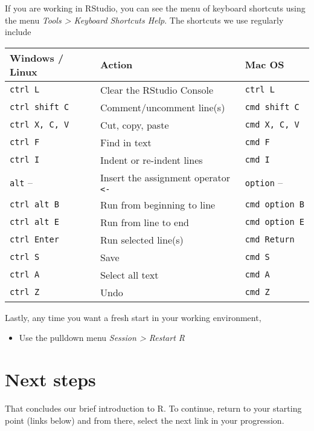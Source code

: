 \documentclass[
]{book}
\providecommand{\tightlist}{%
  \setlength{\itemsep}{0pt}\setlength{\parskip}{0pt}}
\begin{document}
If you are working in RStudio, you can see the menu of keyboard
shortcuts using the menu \emph{Tools \textgreater{} Keyboard Shortcuts Help}. The
shortcuts we use regularly include

\begin{longtable}[]{@{}lll@{}}
\toprule
Windows / Linux & Action & Mac OS \\
\midrule
\endhead
\texttt{ctrl\ L} & Clear the RStudio Console & \texttt{ctrl\ L} \\
\texttt{ctrl\ shift\ C} & Comment/uncomment line(s) & \texttt{cmd\ shift\ C} \\
\texttt{ctrl\ X,\ C,\ V} & Cut, copy, paste & \texttt{cmd\ X,\ C,\ V} \\
\texttt{ctrl\ F} & Find in text & \texttt{cmd\ F} \\
\texttt{ctrl\ I} & Indent or re-indent lines & \texttt{cmd\ I} \\
\texttt{alt} -- & Insert the assignment operator \texttt{\textless{}-} & \texttt{option} -- \\
\texttt{ctrl\ alt\ B} & Run from beginning to line & \texttt{cmd\ option\ B} \\
\texttt{ctrl\ alt\ E} & Run from line to end & \texttt{cmd\ option\ E} \\
\texttt{ctrl\ Enter} & Run selected line(s) & \texttt{cmd\ Return} \\
\texttt{ctrl\ S} & Save & \texttt{cmd\ S} \\
\texttt{ctrl\ A} & Select all text & \texttt{cmd\ A} \\
\texttt{ctrl\ Z} & Undo & \texttt{cmd\ Z} \\
\bottomrule
\end{longtable}

Lastly, any time you want a fresh start in your working environment,

\begin{itemize}
\tightlist
\item
  Use the pulldown menu \emph{Session \textgreater{} Restart R}
\end{itemize}

\hypertarget{next-steps}{%
\section{Next steps}\label{next-steps}}

That concludes our brief introduction to R. To continue, return to your starting point (links below) and from there, select the next link in your progression.
\end{document}
